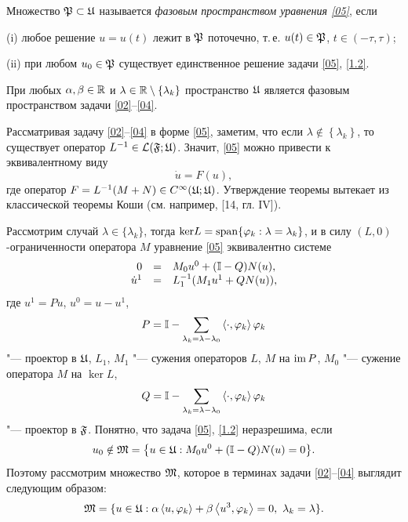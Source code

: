 \smallskip

\begin{definition}[1.1] Множество $\frak P\subset\frak U$ называется {\it фазовым пространством уравнения \eqref{05}}, если

(i) любое решение $u=u(t)$ лежит в $\frak P$ поточечно, т.\,е. $u(t)\in\frak P$, $t\in (-\tau, \tau)$;

(ii) при любом $u_0\in\frak P$ существует единственное решение задачи \eqref{05}, \eqref{1.2}.\end{definition}

\smallskip

\begin{theorem}[1.1]   При любых $\alpha, \beta\in\Bbb R$ и $\lambda\in {\Bbb R}\setminus \{\lambda_k\}$ пространство $\frak U$ является фазовым пространством задачи \eqref{02}--\eqref{04}.\end{theorem}

\smallskip

Рассматривая задачу \eqref{02}--\eqref{04} в форме \eqref{05}, заметим, что если $\lambda\notin\left\{\lambda_k\right\}$, то существует оператор $L^{-1}\in {\cal L} (\frak F; \frak U)$. 
Значит, \eqref{05} можно привести к эквивалентному виду 
\begin{equation}\label{1.3} \dot{u}=F(u),
\end{equation} 
где оператор $F= L^{-1} (M+N)\in C^\infty (\frak U; \frak U)$. 
Утверждение теоремы вытекает из классической теоремы Коши (см. например, [14, гл. IV]).

Рассмотрим случай $\lambda\in\{\lambda_k\}$, тогда ${\rm ker} L = {\rm span} \{\varphi_k: \lambda = \lambda_k\}$, и в силу $(L, 0)$-ограниченности оператора $M$ уравнение \eqref{05} эквивалентно системе
\begin{equation} \label{1.4}
\begin{array}{rcl}
0&=&M_0u^0+ ({\Bbb I}-Q) N(u),\\
\dot{u}{}^1&=&L_1^{-1} (M_1 u^1 + QN(u)),
\end{array}
\end{equation}
где $u^1 = Pu$, $u^0 = u-u^1$, $$P={\Bbb I} - \displaystyle\sum\limits_{\lambda_k=\lambda - \lambda_0} \left\langle \cdot, \varphi_k\right\rangle \varphi_k$$ "--- проектор в $\frak U$, $L_1$, $M_1$ "--- сужения операторов $L$, $M$ на ${\rm im}\, P$, $M_0$ "--- сужение оператора $M$ на $\ker L$, $$Q={\Bbb I} - \displaystyle\sum\limits_{\lambda_k=\lambda - \lambda_0} \left\langle \cdot, \varphi_k\right\rangle \varphi_k$$ "--- проектор в $\frak F$.
Понятно, что задача \eqref{05}, \eqref{1.2} неразрешима, если $$u_0\notin\frak M = \bigl\{u\in \frak U : M_0u^0 + ({\Bbb I}-Q)N(u)=0\bigr\}.$$ 
Поэтому рассмотрим множество $\frak M$, которое в терминах задачи \eqref{02}--\eqref{04} выглядит следующим образом: \begin{equation}\label{1.5} \frak M = \{u\in\frak U: \alpha\left\langle u, \varphi_k\right\rangle + \beta\left\langle u^3, \varphi_k\right\rangle =0,\,\, \lambda_k = \lambda\}.\end{equation}

